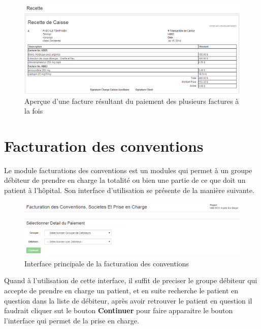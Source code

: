 \documentclass[12pt,a4paper]{report}
\begin{document}
\begin{figure}[h]
\begin{center}
\includegraphics[width=14cm]{pic/FactureDoubles.png}
\end{center}
\caption{Aperçue d'une facture résultant du paiement des plusieurs factures à la fois}
\label{Aperçue d'une facture résultant du paiement des plusieurs factures à la fois}
\end{figure}

\newpage
\section{Facturation des conventions}
Le module facturations des conventions est un modules qui permet à un groupe débiteur de prendre en charge la totalité ou bien une partie de ce que doit un patient à l'hôpital. Son interface d'utilisation se présente de la manière suivante.

\begin{figure}[h]
\begin{center}
\includegraphics[width=14cm]{pic/FacturationConv.png}
\end{center}
\caption{Interface principale de la facturation des conventions}
\label{Interface principale de la facturation des conventions}
\end{figure}

Quand à l'utilisation de cette interface, il suffit de preciser le groupe débiteur qui accepte de prendre en charge un patient, et en suite recherche le patient en question dans la liste de débiteur, après avoir retrouver le patient en question il faudrait cliquer sut le bouton  \textbf{Continuer} pour faire apparaitre le bouton l'interface qui permet de la prise en charge.
\end{document}
